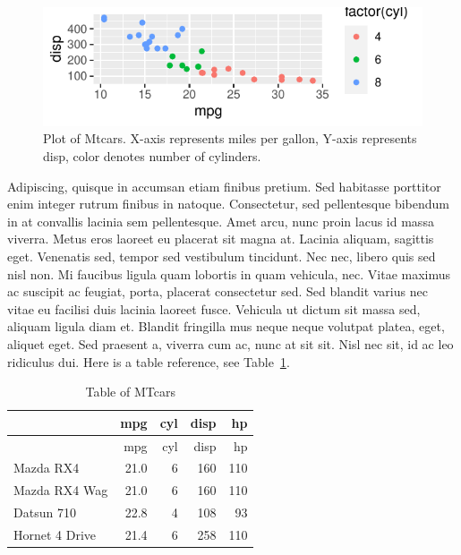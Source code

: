 \documentclass[
  11pt,
  letterpaper,
  DIV=11,
  numbers=noendperiod]{scrartcl}
\begin{document}
\begin{figure}[h]

{\centering \includegraphics{research-strategy-yt2_files/figure-pdf/fig-mtcars1-1.pdf}

}

\caption{\label{fig-mtcars1}Plot of Mtcars. X-axis represents miles per
gallon, Y-axis represents disp, color denotes number of cylinders.}

\end{figure}

Adipiscing, quisque in accumsan etiam finibus pretium. Sed habitasse
porttitor enim integer rutrum finibus in natoque. Consectetur, sed
pellentesque bibendum in at convallis lacinia sem pellentesque. Amet
arcu, nunc proin lacus id massa viverra. Metus eros laoreet eu placerat
sit magna at. Lacinia aliquam, sagittis eget. Venenatis sed, tempor sed
vestibulum tincidunt. Nec nec, libero quis sed nisl non. Mi faucibus
ligula quam lobortis in quam vehicula, nec. Vitae maximus ac suscipit ac
feugiat, porta, placerat consectetur sed. Sed blandit varius nec vitae
eu facilisi duis lacinia laoreet fusce. Vehicula ut dictum sit massa
sed, aliquam ligula diam et. Blandit fringilla mus neque neque volutpat
platea, eget, aliquet eget. Sed praesent a, viverra cum ac, nunc at sit
sit. Nisl nec sit, id ac leo ridiculus dui. Here is a table reference,
see Table~\ref{tbl-mtcars}.

\hypertarget{tbl-mtcars}{}
\begin{longtable}[]{@{}lrrrr@{}}
\caption{\label{tbl-mtcars}Table of MTcars}\tabularnewline
\toprule()
& mpg & cyl & disp & hp \\
\midrule()
\endfirsthead
\toprule()
& mpg & cyl & disp & hp \\
\midrule()
\endhead
Mazda RX4 & 21.0 & 6 & 160 & 110 \\
Mazda RX4 Wag & 21.0 & 6 & 160 & 110 \\
Datsun 710 & 22.8 & 4 & 108 & 93 \\
Hornet 4 Drive & 21.4 & 6 & 258 & 110 \\
\bottomrule()
\end{longtable}
\end{document}
